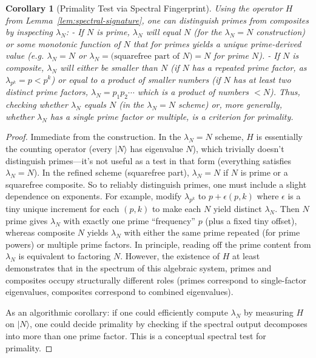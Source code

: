 \documentclass[11pt]{article}
\newtheorem{corollary}{Corollary}
\begin{document}
\begin{corollary}[Primality Test via Spectral Fingerprint]\label{cor:spectral-prime}
Using the operator $H$ from Lemma~\ref{lem:spectral-signature}, one can distinguish primes from composites by inspecting $\lambda_N$:
- If $N$ is prime, $\lambda_N$ will equal $N$ (for the $\lambda_N=N$ construction) or some monotonic function of $N$ that for primes yields a unique prime-derived value (e.g. $\lambda_N = N$ or $\lambda_N = \text{(squarefree part of $N$)} = N$ for prime $N$).
- If $N$ is composite, $\lambda_N$ will either be smaller than $N$ (if $N$ has a repeated prime factor, as $\lambda_{p^k}=p < p^k$) or equal to a product of smaller numbers (if $N$ has at least two distinct prime factors, $\lambda_N = p_1 p_2 \cdots$ which is a product of numbers $<N$).
Thus, checking whether $\lambda_N$ equals $N$ (in the $\lambda_N=N$ scheme) or, more generally, whether $\lambda_N$ has a single prime factor or multiple, is a criterion for primality.
\end{corollary}

\begin{proof}
Immediate from the construction. In the $\lambda_N = N$ scheme, $H$ is essentially the counting operator (every $|N\rangle$ has eigenvalue $N$), which trivially doesn’t distinguish primes—it’s not useful as a test in that form (everything satisfies $\lambda_N = N$). In the refined scheme (squarefree part), $\lambda_N = N$ if $N$ is prime or a squarefree composite. So to reliably distinguish primes, one must include a slight dependence on exponents. For example, modify $\lambda_{p^k}$ to $p + \epsilon(p,k)$ where $\epsilon$ is a tiny unique increment for each $(p,k)$ to make each $N$ yield distinct $\lambda_N$. Then $N$ prime gives $\lambda_N$ with exactly one prime “frequency” $p$ (plus a fixed tiny offset), whereas composite $N$ yields $\lambda_N$ with either the same prime repeated (for prime powers) or multiple prime factors. In principle, reading off the prime content from $\lambda_N$ is equivalent to factoring $N$. However, the existence of $H$ at least demonstrates that in the spectrum of this algebraic system, primes and composites occupy structurally different roles (primes correspond to single-factor eigenvalues, composites correspond to combined eigenvalues).

As an algorithmic corollary: if one could efficiently compute $\lambda_N$ by measuring $H$ on $|N\rangle$, one could decide primality by checking if the spectral output decomposes into more than one prime factor. This is a conceptual spectral test for primality.
\end{proof}
\end{document}
